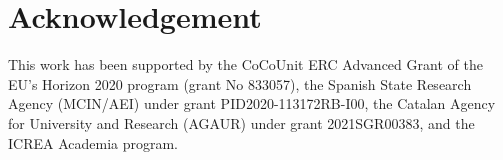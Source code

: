 \section{Acknowledgement}\label{acknowledgement}
This work has been supported by the CoCoUnit ERC Advanced Grant of the EU’s Horizon 2020 program (grant No 833057), the Spanish State Research Agency (MCIN/AEI) under grant PID2020-113172RB-I00, the Catalan Agency for University and Research (AGAUR) under grant 2021SGR00383, and the ICREA Academia program.